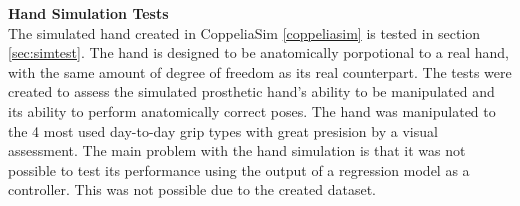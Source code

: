 \documentclass[../main.tex]{subfiles}
\begin{document}
\textbf{Hand Simulation Tests}\\
The simulated hand created in CoppeliaSim \ref{coppeliasim} is tested in section \ref{sec:simtest}.
The hand is designed to be anatomically porpotional to a real hand, with the same amount of degree of freedom as its real counterpart.
The tests were created to assess the simulated prosthetic hand's ability to be manipulated and its ability to perform anatomically correct poses.
The hand was manipulated to the 4 most used day-to-day grip types with great presision by a visual assessment.
The main problem with the hand simulation is that it was not possible to test its performance using the output of a regression model as a controller.
This was not possible due to the created dataset.






\end{document}
